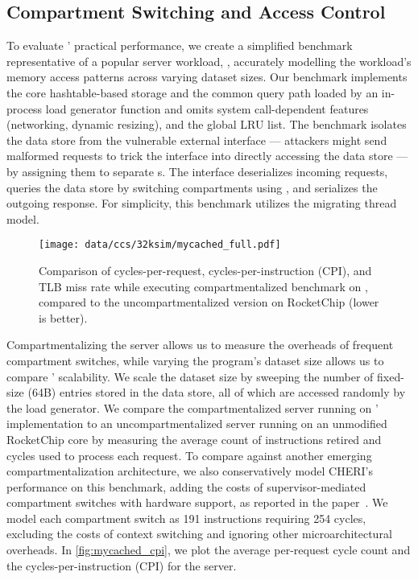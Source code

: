 \subsection{Compartment Switching and Access Control}
To evaluate \seccells' practical performance, we create a simplified 
benchmark representative of a popular server workload, 
, accurately modelling the workload's memory access 
patterns across varying dataset sizes.
Our benchmark implements the core hashtable-based storage and the 
common query path loaded by an in-process load generator function
and omits system call-dependent features (networking, dynamic resizing),
and the global LRU list.
The benchmark isolates the data store from the vulnerable external interface
--- attackers might send malformed requests to trick the interface into directly
accessing the data store ---
by assigning them to separate \secdiv{}s.
The interface deserializes incoming requests, queries the data store
by switching compartments using \sdswitch, and serializes the
outgoing response.
For simplicity, this benchmark utilizes the migrating thread model.

\begin{figure}
  \centering
  \texttt{[image: data/ccs/32ksim/mycached\_full.pdf]}
  \caption{Comparison of cycles-per-request,   
          cycles-per-instruction (CPI), and
          TLB miss rate
          while executing compartmentalized  benchmark on 
          \seccells, compared to the uncompartmentalized version on RocketChip
          (lower is better).
          }
  \label{fig:mycached_cpi}
\end{figure}

Compartmentalizing the server allows us to measure the overheads
of frequent compartment switches, while varying the program's
dataset size allows us to compare \seccells' scalability.
We scale the dataset size by sweeping the number of fixed-size (64B)
entries stored in the data store, all of which are accessed randomly
by the load generator.
We compare the compartmentalized server running on \seccells'
implementation to an uncompartmentalized server running on
an unmodified RocketChip core by measuring the average count of
instructions retired and cycles used to process each request.
To compare against another emerging compartmentalization architecture,
we also conservatively model CHERI's performance on this benchmark,
adding the costs of supervisor-mediated compartment
switches with hardware support, as reported in the paper~\cite{WatsonWNMACDDGL15}.
We model each compartment switch as 191 instructions requiring 254 cycles,
excluding the costs of context switching and
ignoring other microarchitectural overheads.
In \autoref{fig:mycached_cpi}, we plot the average per-request 
cycle count and the cycles-per-instruction (CPI) for the server.

